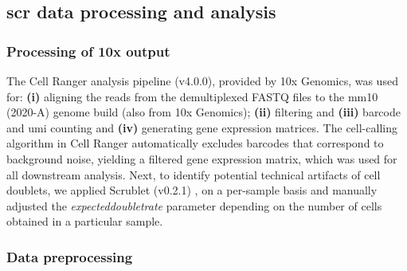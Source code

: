 \subsection[\glsentryshort{scr} data processing and analysis]{\gls{scr} data processing and analysis}
\label{subsec:met_chp2_scrdataprocess}

\subsubsection{\large Processing of 10x output}
\label{subsubsec:met_chp2_10xprocessing}

The Cell Ranger analysis pipeline (v4.0.0), provided by 10x Genomics, was used for: \textbf{(i)} aligning the reads from the demultiplexed FASTQ files to the mm10 (2020-A) genome build (also from 10x Genomics); \textbf{(ii)} filtering and \textbf{(iii)} barcode and \gls{umi} counting and \textbf{(iv)} generating gene expression matrices. The cell-calling algorithm in Cell Ranger automatically excludes barcodes that correspond to background noise, yielding a filtered gene expression matrix, which was used for all downstream analysis. Next, to identify potential technical artifacts of cell doublets, we applied Scrublet (v0.2.1) \textbf{\cite{wolock_scrublet_2019}}, on a per-sample basis and manually adjusted the \textit{expected\textunderscore doublet\textunderscore rate} parameter depending on the number of cells obtained in a particular sample. 

\subsubsection{\large Data preprocessing}
\label{sec:chp2_methods_datapreprocessing}

